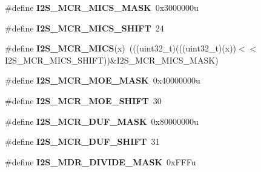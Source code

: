 \begin{DoxyCompactItemize}
\item 
\#define {\bfseries I2\+S\+\_\+\+M\+C\+R\+\_\+\+M\+I\+C\+S\+\_\+\+M\+A\+SK}~0x3000000u\hypertarget{group__I2S__Register__Masks_ga4c26e3cecbf702523474909a853e29b8}{}\label{group__I2S__Register__Masks_ga4c26e3cecbf702523474909a853e29b8}

\item 
\#define {\bfseries I2\+S\+\_\+\+M\+C\+R\+\_\+\+M\+I\+C\+S\+\_\+\+S\+H\+I\+FT}~24\hypertarget{group__I2S__Register__Masks_gabf7e721def09b1b0b95908cfafe51512}{}\label{group__I2S__Register__Masks_gabf7e721def09b1b0b95908cfafe51512}

\item 
\#define {\bfseries I2\+S\+\_\+\+M\+C\+R\+\_\+\+M\+I\+CS}(x)~(((uint32\+\_\+t)(((uint32\+\_\+t)(x))$<$$<$I2\+S\+\_\+\+M\+C\+R\+\_\+\+M\+I\+C\+S\+\_\+\+S\+H\+I\+FT))\&I2\+S\+\_\+\+M\+C\+R\+\_\+\+M\+I\+C\+S\+\_\+\+M\+A\+SK)\hypertarget{group__I2S__Register__Masks_gaaf72b03378aedd558df1c74b19d73f61}{}\label{group__I2S__Register__Masks_gaaf72b03378aedd558df1c74b19d73f61}

\item 
\#define {\bfseries I2\+S\+\_\+\+M\+C\+R\+\_\+\+M\+O\+E\+\_\+\+M\+A\+SK}~0x40000000u\hypertarget{group__I2S__Register__Masks_ga03150d6df8ff9955e1f8175ef1ebd1ab}{}\label{group__I2S__Register__Masks_ga03150d6df8ff9955e1f8175ef1ebd1ab}

\item 
\#define {\bfseries I2\+S\+\_\+\+M\+C\+R\+\_\+\+M\+O\+E\+\_\+\+S\+H\+I\+FT}~30\hypertarget{group__I2S__Register__Masks_ga9e216aa29a6bff56351f468e127fbea5}{}\label{group__I2S__Register__Masks_ga9e216aa29a6bff56351f468e127fbea5}

\item 
\#define {\bfseries I2\+S\+\_\+\+M\+C\+R\+\_\+\+D\+U\+F\+\_\+\+M\+A\+SK}~0x80000000u\hypertarget{group__I2S__Register__Masks_ga215e9b824f46df65ca2fc57784148cae}{}\label{group__I2S__Register__Masks_ga215e9b824f46df65ca2fc57784148cae}

\item 
\#define {\bfseries I2\+S\+\_\+\+M\+C\+R\+\_\+\+D\+U\+F\+\_\+\+S\+H\+I\+FT}~31\hypertarget{group__I2S__Register__Masks_gae490aa013a4b379ce12be811ae32a148}{}\label{group__I2S__Register__Masks_gae490aa013a4b379ce12be811ae32a148}

\item 
\#define {\bfseries I2\+S\+\_\+\+M\+D\+R\+\_\+\+D\+I\+V\+I\+D\+E\+\_\+\+M\+A\+SK}~0x\+F\+F\+Fu\hypertarget{group__I2S__Register__Masks_ga3b44d8acfaecde14d97877635d471e13}{}\label{group__I2S__Register__Masks_ga3b44d8acfaecde14d97877635d471e13}


\end{DoxyCompactItemize}
